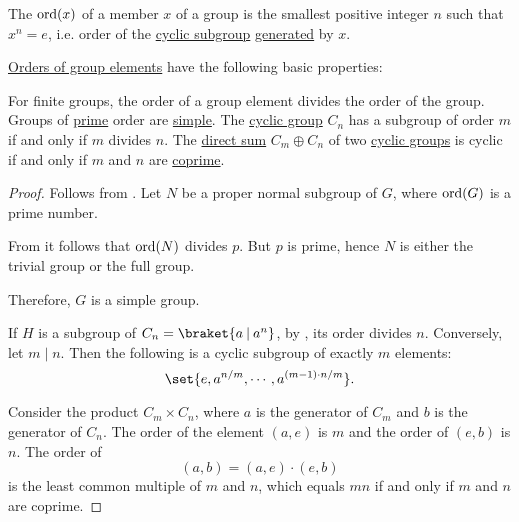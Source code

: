 \begin{definition}\label{def:group_element_order}\mimprovised
  The  \( \operatorname{ord}(x) \) of a member \( x \) of a group is the smallest positive integer \( n \) such that \( x^n = e \), i.e. order of the \hyperref[def:cyclic_group]{cyclic subgroup} \hyperref[def:group/submodel]{generated} by \( x \).
\end{definition}

\begin{proposition}\label{thm:def:group_element_order}
  \hyperref[def:group_element_order]{Orders of group elements} have the following basic properties:
  \begin{thmenum}
     For finite groups, the order of a group element divides the order of the group.
     Groups of \hyperref[def:prime_number]{prime} order are \hyperref[def:simple_object]{simple}.
     The \hyperref[def:cyclic_group]{cyclic group} \( C_n \) has a subgroup of order \( m \) if and only if \( m \) divides \( n \).
     The \hyperref[def:first_order_direct_product]{direct sum} \( C_m \oplus C_n \) of two \hyperref[def:cyclic_group]{cyclic groups} is cyclic if and only if \( m \) and \( n \) are \hyperref[def:coprime_elements]{coprime}.
  \end{thmenum}
\end{proposition}
\begin{proof}
   Follows from .
   Let \( N \) be a proper normal subgroup of \( G \), where \( \operatorname{ord}(G) \) is a prime number.

  From  it follows that \( \operatorname{ord}(N) \) divides \( p \). But \( p \) is prime, hence \( N \) is either the trivial group or the full group.

  Therefore, \( G \) is a simple group.

   If \( H \) is a subgroup of \( C_n = \braket{ a \given a^n } \), by , its order divides \( n \). Conversely, let \( m \mid n \). Then the following is a cyclic subgroup of exactly \( m \) elements:
  \begin{equation*}
    \set{ e, a^{\ifrac n m}, \cdots, a^{(m - 1) \cdot \ifrac n m} }.
  \end{equation*}

   Consider the product \( C_m \times C_n \), where \( a \) is the generator of \( C_m \) and \( b \) is the generator of \( C_n \). The order of the element \( (a, e) \) is \( m \) and the order of \( (e, b) \) is \( n \). The order of
  \begin{equation*}
    (a, b) = (a, e) \cdot (e, b)
  \end{equation*}
  is the least common multiple of \( m \) and \( n \), which equals \( mn \) if and only if \( m \) and \( n \) are coprime.
\end{proof}


